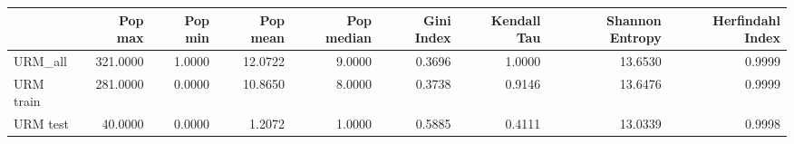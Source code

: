 \begin{tabular}{lrrrrrrrr}
\toprule
{} &  Pop max &  Pop min &  Pop mean &  Pop median &  Gini Index &  Kendall Tau &  Shannon Entropy &  Herfindahl Index \\
\midrule
URM\_all   & 321.0000 &   1.0000 &   12.0722 &      9.0000 &      0.3696 &       1.0000 &          13.6530 &            0.9999 \\
URM train & 281.0000 &   0.0000 &   10.8650 &      8.0000 &      0.3738 &       0.9146 &          13.6476 &            0.9999 \\
URM test  &  40.0000 &   0.0000 &    1.2072 &      1.0000 &      0.5885 &       0.4111 &          13.0339 &            0.9998 \\
\bottomrule
\end{tabular}
